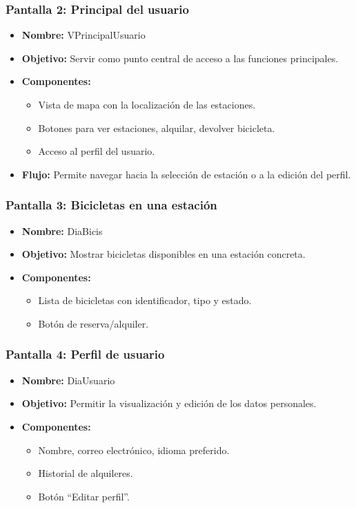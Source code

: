     \subsubsection{Pantalla 2: Principal del usuario}
    \begin{itemize}
        \item \textbf{Nombre:} VPrincipalUsuario
        \item \textbf{Objetivo:} Servir como punto central de acceso a las funciones principales.
        \item \textbf{Componentes:}
        \begin{itemize}
            \item Vista de mapa con la localización de las estaciones.
            \item Botones para ver estaciones, alquilar, devolver bicicleta.
            \item Acceso al perfil del usuario.
        \end{itemize}
        \item \textbf{Flujo:} Permite navegar hacia la selección de estación o a la edición del perfil.
    \end{itemize}

    \subsubsection{Pantalla 3: Bicicletas en una estación}
    \begin{itemize}
        \item \textbf{Nombre:} DiaBicis
        \item \textbf{Objetivo:} Mostrar bicicletas disponibles en una estación concreta.
        \item \textbf{Componentes:}
        \begin{itemize}
            \item Lista de bicicletas con identificador, tipo y estado.
            \item Botón de reserva/alquiler.
        \end{itemize}
    \end{itemize}

    \subsubsection{Pantalla 4: Perfil de usuario}
    \begin{itemize}
        \item \textbf{Nombre:} DiaUsuario
        \item \textbf{Objetivo:} Permitir la visualización y edición de los datos personales.
        \item \textbf{Componentes:}
        \begin{itemize}
            \item Nombre, correo electrónico, idioma preferido.
            \item Historial de alquileres.
            \item Botón ``Editar perfil''.
        \end{itemize}
    \end{itemize}

